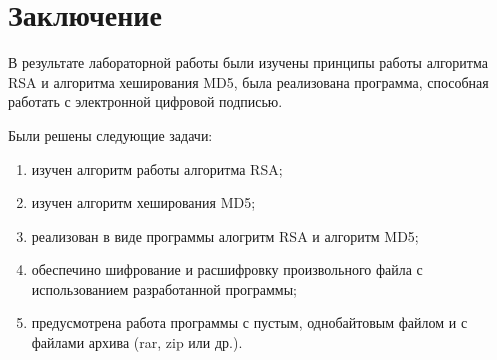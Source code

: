 \chapter*{Заключение}

В результате лабораторной работы были изучены принципы работы алгоритма RSA и алгоритма хеширования MD5, была реализована программа, способная работать с электронной цифровой подписью. 

Были решены следующие задачи:

\begin{enumerate}[label=\arabic*)]
    \item изучен алгоритм работы алгоритма RSA;
    \item изучен алгоритм хеширования MD5;
    \item реализован в виде программы алогритм RSA и алгоритм MD5;
    \item обеспечино шифрование и расшифровку произвольного файла с использованием разработанной программы;
    \item предусмотрена работа программы с пустым, однобайтовым файлом и с файлами архива (rar, zip или др.).
\end{enumerate}